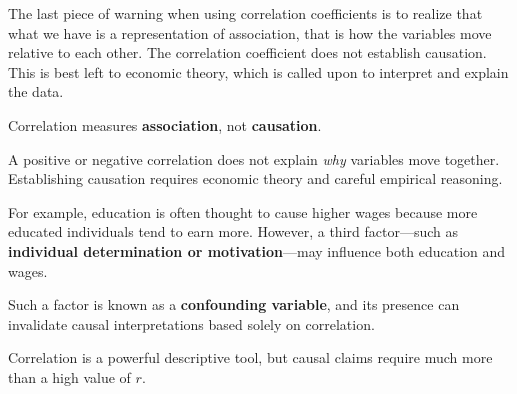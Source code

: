 \documentclass[
  letterpaper,
  DIV=11,
  numbers=noendperiod]{scrreprt}
\begin{document}
The last piece of warning when using correlation coefficients is to
realize that what we have is a representation of association, that is
how the variables move relative to each other. The correlation
coefficient does not establish causation. This is best left to economic
theory, which is called upon to interpret and explain the data.

\begin{tcolorbox}[enhanced jigsaw, coltitle=black, colbacktitle=quarto-callout-important-color!10!white, left=2mm, bottomrule=.15mm, bottomtitle=1mm, colback=white, titlerule=0mm, colframe=quarto-callout-important-color-frame, breakable, leftrule=.75mm, toptitle=1mm, opacitybacktitle=0.6, rightrule=.15mm, title=\textcolor{quarto-callout-important-color}{\faExclamation}\hspace{0.5em}{Important}, arc=.35mm, opacityback=0, toprule=.15mm]

Correlation measures \textbf{association}, not \textbf{causation}.

\end{tcolorbox}

A positive or negative correlation does not explain \emph{why} variables
move together. Establishing causation requires economic theory and
careful empirical reasoning.

For example, education is often thought to cause higher wages because
more educated individuals tend to earn more. However, a third
factor---such as \textbf{individual determination or motivation}---may
influence both education and wages.

Such a factor is known as a \textbf{confounding variable}, and its
presence can invalidate causal interpretations based solely on
correlation.

\begin{tcolorbox}[enhanced jigsaw, coltitle=black, colbacktitle=quarto-callout-important-color!10!white, left=2mm, bottomrule=.15mm, bottomtitle=1mm, colback=white, titlerule=0mm, colframe=quarto-callout-important-color-frame, breakable, leftrule=.75mm, toptitle=1mm, opacitybacktitle=0.6, rightrule=.15mm, title=\textcolor{quarto-callout-important-color}{\faExclamation}\hspace{0.5em}{Takeaway}, arc=.35mm, opacityback=0, toprule=.15mm]

Correlation is a powerful descriptive tool, but causal claims require
much more than a high value of \(r\).

\end{tcolorbox}
\end{document}
